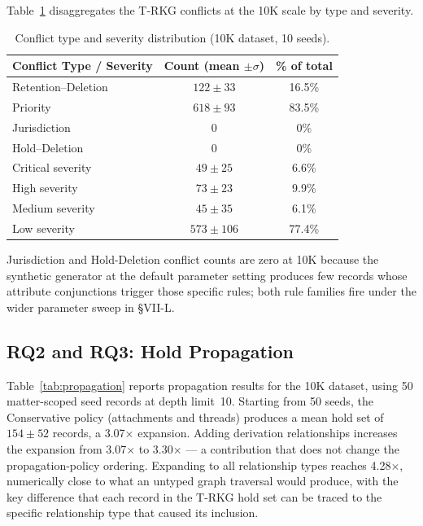 \documentclass{ieeeaccess}
\begin{document}
Table~\ref{tab:typesev} disaggregates the T-RKG conflicts at the 10K scale by type and severity.

\begin{table}[t]
\centering
\caption{Conflict type and severity distribution (10K dataset, 10 seeds).}
\label{tab:typesev}
\begin{tabular}{lcc}
\hline\hline
Conflict Type / Severity & Count (mean $\pm \sigma$) & \% of total \\
\hline
Retention--Deletion & $122 \pm 33$ & 16.5\% \\
Priority            & $618 \pm 93$ & 83.5\% \\
Jurisdiction        & 0            & 0\% \\
Hold--Deletion      & 0            & 0\% \\
\hline
Critical severity   & $49 \pm 25$  & 6.6\% \\
High severity       & $73 \pm 23$  & 9.9\% \\
Medium severity     & $45 \pm 35$  & 6.1\% \\
Low severity        & $573 \pm 106$ & 77.4\% \\
\hline\hline
\end{tabular}
\end{table}

Jurisdiction and Hold-Deletion conflict counts are zero at 10K because the synthetic generator at the default parameter setting produces few records whose attribute conjunctions trigger those specific rules; both rule families fire under the wider parameter sweep in §VII-L.

\subsection{RQ2 and RQ3: Hold Propagation}

Table~\ref{tab:propagation} reports propagation results for the 10K dataset, using 50 matter-scoped seed records at depth limit~10. Starting from 50 seeds, the Conservative policy (attachments and threads) produces a mean hold set of $154 \pm 52$ records, a 3.07$\times$ expansion. Adding derivation relationships increases the expansion from 3.07$\times$ to 3.30$\times$ --- a contribution that does not change the propagation-policy ordering. Expanding to all relationship types reaches 4.28$\times$, numerically close to what an untyped graph traversal would produce, with the key difference that each record in the T-RKG hold set can be traced to the specific relationship type that caused its inclusion.
\end{document}
